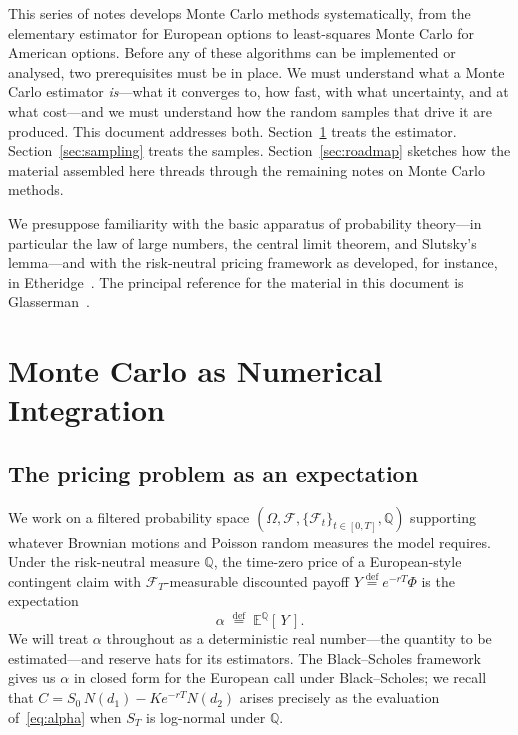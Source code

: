 \documentclass[11pt,a4paper]{article}
\theoremstyle{plain}
\theoremstyle{definition}
\theoremstyle{remark}
\newcommand{\E}{\mathbb{E}}
\newcommand{\F}{\mathcal{F}}
\newcommand{\Q}{\mathbb{Q}}
\newcommand{\eqdef}{\overset{\mathrm{def}}{=}}
\begin{document}
This series of notes develops Monte Carlo methods systematically,
from the elementary estimator for European options to least-squares
Monte Carlo for American options. Before any of these algorithms can be
implemented or analysed, two prerequisites must be in place. We must
understand what a Monte Carlo estimator \emph{is}---what it converges
to, how fast, with what uncertainty, and at what cost---and we must
understand how the random samples that drive it are produced. This
document addresses both. Section~\ref{sec:mc-as-integration} treats the
estimator. Section~\ref{sec:sampling} treats the samples.
Section~\ref{sec:roadmap} sketches how the material assembled here
threads through the remaining notes on Monte Carlo methods.

We presuppose familiarity with the basic apparatus of probability
theory---in particular the law of large numbers, the central limit
theorem, and Slutsky's lemma---and with the risk-neutral pricing
framework as developed, for instance, in Etheridge~\cite{Etheridge}. The
principal reference for the material in this document is
Glasserman~\cite[Chapters~1 and~2]{Glasserman}.

\section{Monte Carlo as Numerical Integration}
\label{sec:mc-as-integration}

\subsection{The pricing problem as an expectation}

We work on a filtered probability space
$(\Omega, \F, \{\F_t\}_{t \in [0,T]}, \Q)$ supporting whatever Brownian
motions and Poisson random measures the model requires. Under the
risk-neutral measure $\Q$, the time-zero price of a European-style
contingent claim with $\F_T$-measurable discounted payoff
$Y \eqdef e^{-rT}\Phi$ is the expectation
\begin{equation}
\label{eq:alpha}
\alpha \;\eqdef\; \E^{\Q}[\,Y\,].
\end{equation}
We will treat $\alpha$ throughout as a deterministic real number---the
quantity to be estimated---and reserve hats for its estimators. The
Black--Scholes framework gives us $\alpha$ in closed form for the
European call
under Black--Scholes; we recall that $C = S_0\,N(d_1) - K e^{-rT} N(d_2)$
arises precisely as the evaluation of~\eqref{eq:alpha} when $S_T$ is
log-normal under $\Q$.
\end{document}
